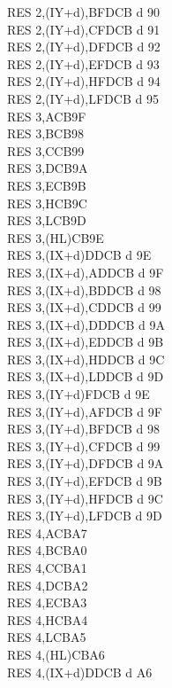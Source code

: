 \documentclass[12pt,twoside,openright,a4paper]{book}
\begin{document}
\begin{multicols}{3}
{\begin{tabbing}
		RES 2,(IY+d),B\UNDOC\>FDCB d 90\\
		RES 2,(IY+d),C\UNDOC\>FDCB d 91\\
		RES 2,(IY+d),D\UNDOC\>FDCB d 92\\
		RES 2,(IY+d),E\UNDOC\>FDCB d 93\\
		RES 2,(IY+d),H\UNDOC\>FDCB d 94\\
		RES 2,(IY+d),L\UNDOC\>FDCB d 95\\
		RES 3,A\>CB9F\\
		RES 3,B\>CB98\\
		RES 3,C\>CB99\\
		RES 3,D\>CB9A\\
		RES 3,E\>CB9B\\
		RES 3,H\>CB9C\\
		RES 3,L\>CB9D\\
		RES 3,(HL)\>CB9E\\
		RES 3,(IX+d)\>DDCB d 9E\\
		RES 3,(IX+d),A\UNDOC\>DDCB d 9F\\
		RES 3,(IX+d),B\UNDOC\>DDCB d 98\\
		RES 3,(IX+d),C\UNDOC\>DDCB d 99\\
		RES 3,(IX+d),D\UNDOC\>DDCB d 9A\\
		RES 3,(IX+d),E\UNDOC\>DDCB d 9B\\
		RES 3,(IX+d),H\UNDOC\>DDCB d 9C\\
		RES 3,(IX+d),L\UNDOC\>DDCB d 9D\\
		RES 3,(IY+d)\>FDCB d 9E\\
		RES 3,(IY+d),A\UNDOC\>FDCB d 9F\\
		RES 3,(IY+d),B\UNDOC\>FDCB d 98\\
		RES 3,(IY+d),C\UNDOC\>FDCB d 99\\
		RES 3,(IY+d),D\UNDOC\>FDCB d 9A\\
		RES 3,(IY+d),E\UNDOC\>FDCB d 9B\\
		RES 3,(IY+d),H\UNDOC\>FDCB d 9C\\
		RES 3,(IY+d),L\UNDOC\>FDCB d 9D\\
		RES 4,A\>CBA7\\
		RES 4,B\>CBA0\\
		RES 4,C\>CBA1\\
		RES 4,D\>CBA2\\
		RES 4,E\>CBA3\\
		RES 4,H\>CBA4\\
		RES 4,L\>CBA5\\
		RES 4,(HL)\>CBA6\\
		RES 4,(IX+d)\>DDCB d A6\\

\end{tabbing}}
\end{multicols}
\end{document}
